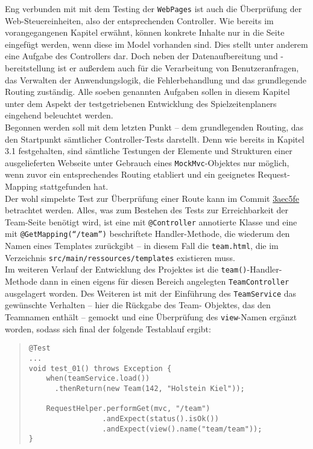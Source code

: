 
Eng verbunden mit mit dem Testing der \texttt{WebPages} ist auch die Überprüfung der 
Web-Steuereinheiten, also der entsprechenden Controller. Wie bereits im 
vorangegangenen Kapitel erwähnt, können konkrete Inhalte nur in die Seite eingefügt 
werden, wenn diese im Model vorhanden sind. Dies stellt unter anderem eine Aufgabe 
des Controllers dar. Doch neben der Datenaufbereitung und -bereitstellung ist er 
außerdem auch für die Verarbeitung von Benutzeranfragen, das Verwalten der 
Anwendungslogik, die Fehlerbehandlung und das grundlegende Routing zuständig. 
Alle soeben genannten Aufgaben sollen in diesem Kapitel unter dem Aspekt der 
testgetriebenen Entwicklung des Spielzeitenplaners eingehend beleuchtet werden. \\ 
Begonnen werden soll mit dem letzten Punkt -- dem grundlegenden Routing, das den 
Startpunkt sämtlicher Controller-Tests darstellt. Denn wie bereits in Kapitel 3.1 
festgehalten, sind sämtliche Testungen der Elemente und Strukturen einer 
ausgelieferten Webseite unter Gebrauch eines \texttt{MockMvc}-Objektes nur möglich, 
wenn zuvor ein entsprechendes Routing etabliert und ein geeignetes Request-Mapping 
stattgefunden hat. \\ 
Der wohl simpelste Test zur Überprüfung einer Route kann im Commit 
\href{https://github.com/FlorianOhmes/bat_spielzeitenplaner/commit/3aec5fe64e1b73cbaace8d56c9fb315b274ed0ad}{3aec5fe}
betrachtet werden. Alles, was zum Bestehen des Tests zur Erreichbarkeit der 
Team-Seite benötigt wird, ist eine mit \texttt{@Controller} annotierte Klasse und 
eine mit \texttt{@GetMapping(``/team'')} beschriftete Handler-Methode, die wiederum 
den Namen eines Templates zurückgibt -- in diesem Fall die \texttt{team.html}, die im 
Verzeichnis \texttt{src/main/ressources/templates} existieren muss. \\ 
Im weiteren Verlauf der Entwicklung des Projektes ist die 
\texttt{team()}-Handler-Methode dann in einen eigens für diesen Bereich angelegten 
\texttt{TeamController} ausgelagert worden. Des Weiteren ist mit der Einführung des 
\texttt{TeamService} das gewünschte Verhalten -- hier die Rückgabe des Team-
Objektes, das den Teamnamen enthält -- gemockt und eine Überprüfung des 
\texttt{view}-Namen ergänzt worden, sodass sich final der folgende Testablauf 
ergibt:

\begin{quote}
\begin{verbatim}
@Test
...
void test_01() throws Exception {
    when(teamService.load())
      .thenReturn(new Team(142, "Holstein Kiel"));

    RequestHelper.performGet(mvc, "/team")
                 .andExpect(status().isOk())
                 .andExpect(view().name("team/team"));
}
\end{verbatim}
\end{quote}


